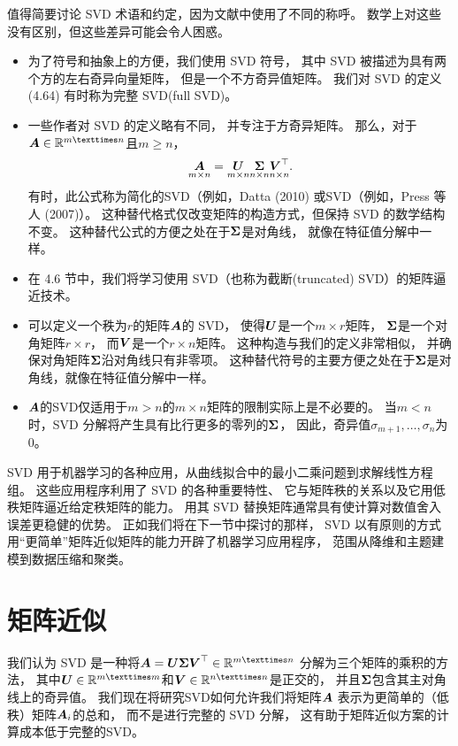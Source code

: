 值得简要讨论 SVD 术语和约定，因为文献中使用了不同的称呼。
数学上对这些没有区别，但这些差异可能会令人困惑。
\begin{itemize}
\item
为了符号和抽象上的方便，我们使用 SVD 符号，
其中 SVD 被描述为具有两个方的左右奇异向量矩阵，
但是一个不方奇异值矩阵。
我们对 SVD 的定义 (4.64) 有时称为完整 SVD(full SVD)。
\item
一些作者对 SVD 的定义略有不同，
并专注于方奇异矩阵。
那么，对于$\A \in \R^{m×n}$且$m \geqslant n$，
\begin{equation}
    \underset{m \times n}{\boldsymbol{A}} =
    \underset{m \times n}{\boldsymbol{U}}
    \underset{n \times n}{\boldsymbol{\Sigma}}
    \underset{n \times n}{\boldsymbol{V}^\top}.
\end{equation}
有时，此公式称为简化的SVD（例如，Datta (2010)
或SVD（例如，Press 等人 (2007)）。
这种替代格式仅改变矩阵的构造方式，但保持 SVD 的数学结构不变。
这种替代公式的方便之处在于$\boldsymbol{\Sigma}$是对角线，
就像在特征值分解中一样。
\item
在 4.6 节中，我们将学习使用 SVD（也称为截断(truncated) SVD）的矩阵逼近技术。
\item
可以定义一个秩为$r$的矩阵$\boldsymbol{A}$的 SVD，
使得$\boldsymbol{U}$是一个$m × r$矩阵，
$\boldsymbol{\Sigma}$是一个对角矩阵$r × r$，
而$\boldsymbol{V}$是一个$r × n$矩阵。
这种构造与我们的定义非常相似，
并确保对角矩阵$\boldsymbol{\Sigma}$沿对角线只有非零项。
这种替代符号的主要方便之处在于$\boldsymbol{\Sigma}$是对角线，就像在特征值分解中一样。
\item
$\boldsymbol{A}$的SVD仅适用于$m > n$的$m × n$矩阵的限制实际上是不必要的。
当$m < n$时，SVD 分解将产生具有比行更多的零列的$\boldsymbol{\Sigma}$，
因此，奇异值$\sigma_{m+1},\dots, \sigma_n$为 0。
\end{itemize}

SVD 用于机器学习的各种应用，从曲线拟合中的最小二乘问题到求解线性方程组。
这些应用程序利用了 SVD 的各种重要特性、
它与矩阵秩的关系以及它用低秩矩阵逼近给定秩矩阵的能力。
用其 SVD 替换矩阵通常具有使计算对数值舍入误差更稳健的优势。
正如我们将在下一节中探讨的那样，
SVD 以有原则的方式用“更简单”矩阵近似矩阵的能力开辟了机器学习应用程序，
范围从降维和主题建模到数据压缩和聚类。

\section{矩阵近似}
我们认为 SVD 是一种将$\A = \U\bs{\Sigma}\V^\top \in \R^{m×n}$
分解为三个矩阵的乘积的方法，
其中$\U \in \R^{m×m}$和$\V \in \R^{n×n}$是正交的，
并且$\boldsymbol{\Sigma}$包含其主对角线上的奇异值。
我们现在将研究SVD如何允许我们将矩阵$\boldsymbol{A}$
表示为更简单的（低秩）矩阵$\boldsymbol{A}_i$的总和，
而不是进行完整的 SVD 分解，
这有助于矩阵近似方案的计算成本低于完整的SVD。

